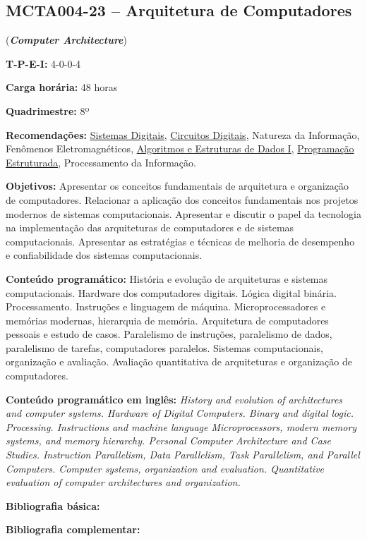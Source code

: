 \documentclass[class=article, crop=false]{standalone}
\begin{document}
\subsection*{MCTA004-23 -- Arquitetura de Computadores}
\label{disc:arq}

(\textbf{\textit{Computer Architecture}})

\begin{center}
    \begin{minipage}{0.85\textwidth}
        \textbf{T-P-E-I:} 4-0-0-4
        
        \textbf{Carga horária:} 48 horas
        
        \textbf{Quadrimestre:} 8º
        
        \textbf{Recomendações:} 
        \hyperref[disc:sist_dig]{Sistemas Digitais},
        \hyperref[disc:circ_dig]{Circuitos Digitais},
        Natureza da Informação,
        Fenômenos Eletromagnéticos, 
        \hyperref[disc:aedI]{Algoritmos e Estruturas de Dados I},
        \hyperref[disc:pe]{Programação Estruturada},
        Processamento da Informação.
    \end{minipage}
\end{center}

\textbf{Objetivos:}
Apresentar os conceitos fundamentais de arquitetura e organização de
computadores.
Relacionar a aplicação dos conceitos fundamentais nos projetos modernos de
sistemas computacionais.
Apresentar e discutir o papel da tecnologia na implementação das arquiteturas
de computadores e de sistemas computacionais.
Apresentar as estratégias e técnicas de melhoria de desempenho e confiabilidade
dos sistemas computacionais.


\textbf{Conteúdo programático:}
História e evolução de arquiteturas e sistemas computacionais.
Hardware dos computadores digitais.
Lógica digital binária.
Processamento.
Instruções e linguagem de máquina.
Microprocessadores e memórias modernas, hierarquia de memória.
Arquitetura de computadores pessoais e estudo de casos.
Paralelismo de instruções, paralelismo de dados, paralelismo de tarefas,
computadores paralelos.
Sistemas computacionais, organização e avaliação.
Avaliação quantitativa de arquiteturas e organização de computadores.

\textbf{Conteúdo programático em inglês:} 
\textit{History and evolution of architectures and computer systems.
Hardware of Digital Computers.
Binary and digital logic. 
Processing.
Instructions and machine language
Microprocessors, modern memory systems, and memory hierarchy.
Personal Computer Architecture and Case Studies.
Instruction Parallelism, Data Parallelism, Task Parallelism, and Parallel Computers.
Computer systems, organization and evaluation.
Quantitative evaluation of computer architectures and organization.}

\newrefsection
\textbf{Bibliografia básica:}
\nocite{2010-stallings, 2013-tanenbaum, 2014-patterson}
\printbibliography

\newrefsection
\textbf{Bibliografia complementar:}
\nocite{2013-hennessy, 2021-nilsan, 2010-null, 2013-harris, 2005-dantas}
\printbibliography
\end{document}
